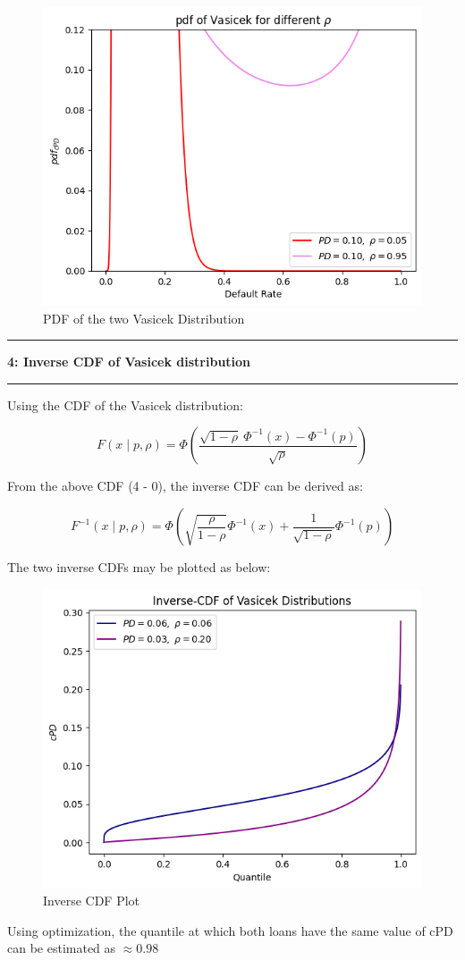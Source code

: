 \documentclass[11pt]{article}
\newcommand\question[2]{\vspace{.25in}\hrule\textbf{#1: #2}\vspace{.5em}\hrule\vspace{.10in}}
\begin{document}
\begin{figure}[h]
\centering
\includegraphics[scale=0.8]{Q3-2.png}
\caption{PDF of the two Vasicek Distribution}
\label{Fig:Q3-2}
\end{figure}

\newpage

\question{4}{Inverse CDF of Vasicek distribution}

Using the CDF of the Vasicek distribution:

\begin{equation} \tag{4 - 0}
F(x \mid p, \rho) = 
\Phi \left(
\frac{\sqrt{1 - \rho} \ \Phi^{-1}(x) - \Phi^{-1}(p)}
{\sqrt{\rho}}
\right)
\end{equation}

From the above CDF (4 - 0), the inverse CDF can be derived as:

\begin{equation} \tag{4 - 1}
F^{-1}(x \mid p, \rho) = 
\Phi \left(
\sqrt{\frac{\rho}{1 - \rho}} \Phi^{-1}(x)
+ \frac{1}{\sqrt{1 - \rho}} \Phi^{-1}(p)
\right)
\end{equation}

The two inverse CDFs may be plotted as below:

\begin{figure}[h]
\centering
\includegraphics[scale=0.8]{Q4.png}
\caption{Inverse CDF Plot}
\label{Fig:Q4}
\end{figure}

Using optimization, the quantile at which both loans have
the same value of cPD can be estimated as $\approx 0.98$
\end{document}
